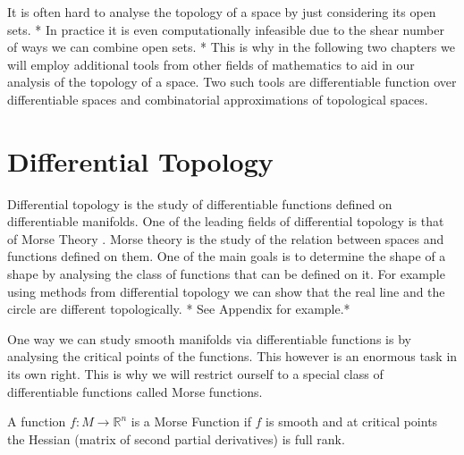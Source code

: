 
It is often hard to analyse the topology of a space by just considering its open sets. * In practice it is even computationally infeasible due to the shear number of ways we can combine open sets. * This is why in the following two chapters we will employ additional tools from other fields of mathematics to aid in our analysis of the topology of a space. Two such tools are differentiable function over differentiable spaces and combinatorial approximations of topological spaces.













\section{Differential Topology}

Differential topology is the study of differentiable functions defined on differentiable manifolds. One of the leading fields of differential topology is that of Morse Theory \cite{morse-theory-book, morse-theory-book-milnor}. Morse theory is the study of the relation between spaces and functions defined on them. One of the main goals is to determine the shape of a shape by analysing the class of functions that can be defined on it. For example using methods from differential topology we can show that the real line and the circle are different topologically. * See Appendix for example.*

One way we can study smooth manifolds via differentiable functions is by analysing the critical points of the functions. This however is an enormous task in its own right. This is why we will restrict ourself to a special class of differentiable functions called Morse functions.

\begin{defn} A function $f: M \to \mathbb{R}^n$ is a Morse Function if $f$ is smooth and at critical points the Hessian (matrix of second partial derivatives) is full rank.   \end{defn}

